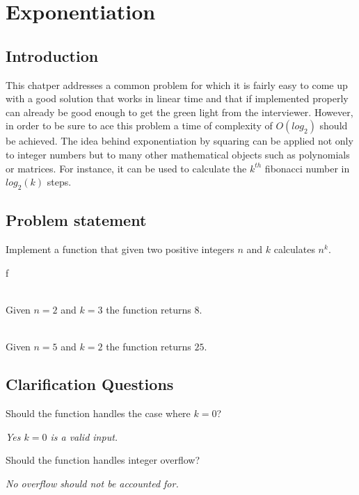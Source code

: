 %

\chapter{Exponentiation}
\label{ch:exponentiation}
\section*{Introduction}
This chatper addresses a common problem for which it is fairly easy to come up with a good solution that works in linear time and that if implemented properly can already be good enough to get the green light from the interviewer. However, in order to be sure to ace this problem a time of complexity of  $O(log_2)$ should be achieved.
The idea behind exponentiation by squaring can be applied not only to integer numbers but to many other mathematical objects such as polynomials or matrices. For instance, it can be used to calculate the $k^{th}$ fibonacci number in $log_2(k)$ steps. 

\section{Problem statement}
\begin{exercise}
Implement a function that given two positive integers $n$ and $k$ calculates $n^k$.
\end{exercise}
f

\begin{example}
	\hfill \\
	Given $n=2$ and $k=3$ the function returns $8$.
\end{example}

\begin{example}
	\hfill \\
	Given $n=5$ and $k=2$ the function returns $25$.
\end{example}

\section{Clarification Questions}

\begin{QandA}
	\item Should the function handles the case where $k=0$?
	\begin{answered}
		\textit{Yes $k=0$ is a valid input.}
	\end{answered}
	
	\item Should the function handles integer overflow?
	\begin{answered}
		\textit{No overflow should not be accounted for. }
	\end{answered}
		
\end{QandA}


